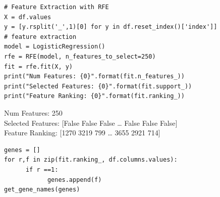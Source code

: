 \documentclass[11pt]{article}
\begin{document}
\begin{verbatim}
# Feature Extraction with RFE
X = df.values
y = [y.rsplit('_',1)[0] for y in df.reset_index()['index']]
# feature extraction
model = LogisticRegression()
rfe = RFE(model, n_features_to_select=250)
fit = rfe.fit(X, y)
print("Num Features: {0}".format(fit.n_features_))
print("Selected Features: {0}".format(fit.support_))
print("Feature Ranking: {0}".format(fit.ranking_))
\end{verbatim}

Num Features: 250\\
Selected Features: [False False False \ldots{} False False False]\\
Feature Ranking: [1270 3219  799 \ldots{} 3655 2921  714]\\


\begin{verbatim}
genes = []
for r,f in zip(fit.ranking_, df.columns.values):
      if r ==1:
            genes.append(f)
get_gene_names(genes)
\end{verbatim}
\end{document}
